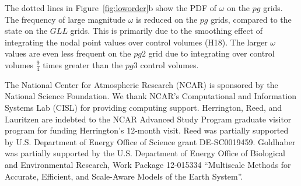 \documentclass{agujournal}
\begin{document}
The dotted lines in Figure~\ref{fig:loworder}b show the PDF of $\omega$ on the $pg$ grids. The frequency of large magnitude $\omega$ is reduced on the $pg$ grids, compared to the state on the $GLL$ grids. This is primarily due to the smoothing effect of integrating the nodal point values over control volumes (H18). The larger $\omega$ values are even less frequent on the $pg2$ grid due to integrating over control volumes $\frac{9}{4}$ times greater than the $pg3$ control volumes. 


%
%
%
%
%
%
%

\acknowledgments
The National Center for Atmospheric Research (NCAR) is sponsored by the National Science Foundation.  We thank NCAR's Computational and Information Systems Lab (CISL) for providing computing support. Herrington, Reed, and Lauritzen are indebted to the NCAR Advanced Study Program graduate visitor program for funding Herrington’s 12-month visit. Reed was partially supported by U.S. Department of Energy Office of Science grant DE-SC0019459. Goldhaber was partially supported by the U.S. Department of Energy Office of Biological and Environmental Research, Work Package 12-015334 ``Multiscale Methods for Accurate, Efficient, and Scale-Aware Models of the Earth System''.




\end{document}
